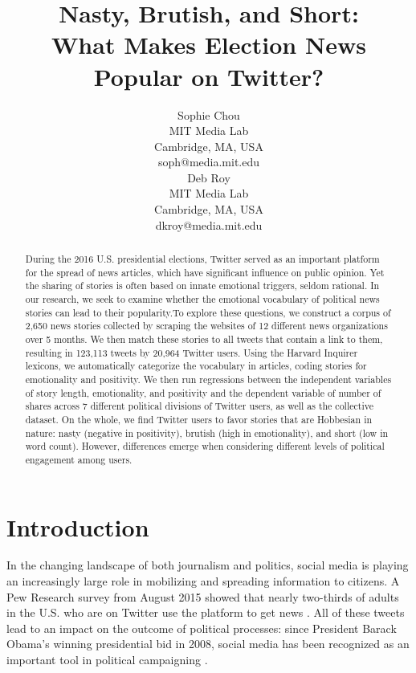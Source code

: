 \documentclass[letterpaper]{article}
\begin{document}
%
\title{Nasty, Brutish, and Short:\\
What Makes Election News Popular on Twitter?}
\author{Sophie Chou\\
MIT Media Lab\\
Cambridge, MA, USA\\
soph@media.mit.edu\\
\And
Deb Roy\\
MIT Media Lab\\
Cambridge, MA, USA\\
dkroy@media.mit.edu\\
}
\maketitle
\begin{abstract}
During the 2016 U.S. presidential elections, Twitter served as an important platform for the spread of news articles, which have significant influence on public opinion. Yet the sharing of stories is often based on innate emotional triggers, seldom rational. In our research, we seek to examine whether the emotional vocabulary of political news stories can lead to their popularity.To explore these questions, we construct a corpus of 2,650 news stories collected by scraping the websites of 12 different news organizations over 5 months. We then match these stories to all tweets that contain a link to them, resulting in 123,113 tweets by 20,964 Twitter users. Using the Harvard Inquirer lexicons, we automatically categorize the vocabulary in articles, coding stories for emotionality and positivity. We then run regressions between the independent variables of story length, emotionality, and positivity and the dependent variable of number of shares across 7 different political divisions of Twitter users, as well as the collective dataset. On the whole, we find Twitter users to favor stories that are Hobbesian in nature: nasty (negative in positivity), brutish (high in emotionality), and short (low in word count). However, differences emerge when considering different levels of political engagement among users.

\end{abstract}

 
\section{Introduction}
In the changing landscape of both journalism and politics, social media is playing an increasingly large role in mobilizing and spreading information to citizens. A Pew Research survey from August 2015 showed that nearly two-thirds of adults in the U.S. who are on Twitter use the platform to get news \cite{pew-Twitter-news}. All of these tweets lead to an impact on the outcome of political processes: since President Barack Obama's winning presidential bid in 2008, social media has been recognized as an important tool in political campaigning \cite{cogburn2011networked}. %
 
\end{document}
